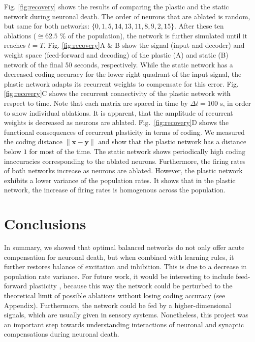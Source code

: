 \documentclass[twoside,twocolumn]{article}
\renewcommand{\b}[1]{\textbf{#1}}
\begin{document}
Fig. \ref{fig:recovery} shows the results of comparing the plastic and the static network during neuronal death. The order of neurons that are ablated is random, but same for both networks: $\{ 0, 1, 5 ,14,13,11, 8,9,2,15\}$. After these ten ablations ($\cong62.5$ \% of the population), the network is further simulated until it reaches $t=T$. Fig. \ref{fig:recovery}A \& B show the signal (input and decoder) and weight space (feed-forward and decoding) of the plastic (A) and static (B) network of the final 50 seconds, respectively. While the static network has a decreased coding accuracy for the lower right quadrant of the input signal, the plastic network adapts its recurrent weights to compensate for this error. Fig. \ref{fig:recovery}C shows the recurrent connectivity of the plastic network with respect to time. Note that each matrix are spaced in time by $\Delta t=100$ s, in order to show individual ablations. It is apparent, that the amplitude of recurrent weights is decreased as neurons are ablated. Fig.~\ref{fig:recovery}D shows the functional consequences of recurrent plasticity in terms of coding. We measured the coding distance $\|\b{x}-\b{y}\|$ and show that the plastic network has a distance below $1$ for most of the time. The static network shows periodically high coding inaccuracies corresponding to the ablated neurons. Furthermore, the firing rates of both networks increase as neurons are ablated. However, the plastic network exhibits a lower variance of the population rates. It shows that in the plastic network, the increase of firing rates is homogenous across the population.


\section{Conclusions}
\label{sec:discuss}

In summary, we showed that optimal balanced networks do not only offer acute compensation for neuronal death, but when combined with learning rules, it further restores balance of excitation and inhibition. This is due to a decrease in population rate variance. For future work, it would be interesting to include feed-forward plasticity \cite{Brendel2016}, because this way the network could be perturbed to the theoretical limit of possible ablations without losing coding accuracy (see Appendix). Furthermore, the network could be fed by a higher-dimensional signals, which are usually given in sensory systems. Nonetheless, this project was an important step towards understanding interactions of neuronal and synaptic compensations during neuronal death.
\end{document}
